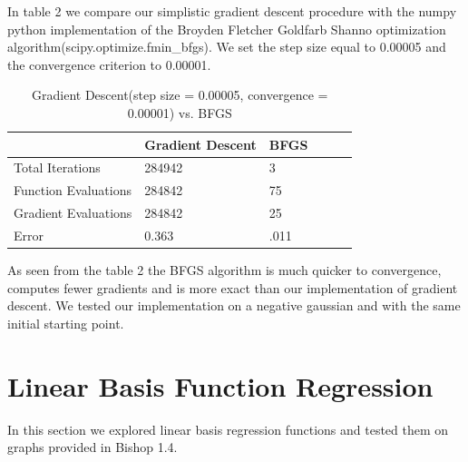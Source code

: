 \documentclass[pageno]{jpaper}
\begin{document}
In table 2 we compare our simplistic gradient descent procedure with the numpy python implementation of the 
Broyden Fletcher Goldfarb Shanno optimization algorithm(scipy.optimize.fmin\_bfgs). We set the step size equal to 0.00005 and the convergence criterion to 0.00001.

\begin{table}[h!]
  \centering
  \begin{tabular}{llllll|}
    \hline
     \textbf{} & \textbf{Gradient Descent}  & \textbf{BFGS}  \\
     

    \hline
 Total Iterations &284942 	&3   \\
 \hline
 Function Evaluations &284842 	&75   \\
 \hline
 Gradient Evaluations &284842 &25\\
  \hline
Error &0.363 &.011\\
   \hline
  \end{tabular}
  \caption{Gradient Descent(step size = 0.00005, convergence =  0.00001) vs. BFGS}
  \label{table:formatting}
\end{table}
 
 As seen from the table 2 the BFGS algorithm is much quicker to convergence, computes fewer gradients and is more exact than our implementation of gradient descent. We tested our implementation on a negative gaussian and with the same initial starting point. 
 
\section{Linear Basis Function Regression}

In this section we explored linear basis regression functions and tested them on graphs provided in Bishop 1.4.
\end{document}
